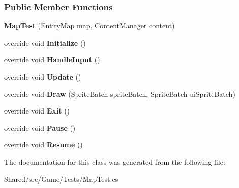 \subsubsection*{Public Member Functions}
\begin{DoxyCompactItemize}
\item 
\hypertarget{class_midnight_blue_1_1_testing_1_1_map_test_a7fb98572efcce64a85eaec1363fdddd4}{}\label{class_midnight_blue_1_1_testing_1_1_map_test_a7fb98572efcce64a85eaec1363fdddd4} 
{\bfseries Map\+Test} (Entity\+Map map, Content\+Manager content)
\item 
\hypertarget{class_midnight_blue_1_1_testing_1_1_map_test_adcaa2f37efbf5764b48d297cabf17784}{}\label{class_midnight_blue_1_1_testing_1_1_map_test_adcaa2f37efbf5764b48d297cabf17784} 
override void {\bfseries Initialize} ()
\item 
\hypertarget{class_midnight_blue_1_1_testing_1_1_map_test_ad7e54e4aec415ccf6e89ce8a8876d259}{}\label{class_midnight_blue_1_1_testing_1_1_map_test_ad7e54e4aec415ccf6e89ce8a8876d259} 
override void {\bfseries Handle\+Input} ()
\item 
\hypertarget{class_midnight_blue_1_1_testing_1_1_map_test_ae4bb817dd9c5b55bd1d818de9f527c7c}{}\label{class_midnight_blue_1_1_testing_1_1_map_test_ae4bb817dd9c5b55bd1d818de9f527c7c} 
override void {\bfseries Update} ()
\item 
\hypertarget{class_midnight_blue_1_1_testing_1_1_map_test_a03d0a9349662afafaa301a8581fbf01f}{}\label{class_midnight_blue_1_1_testing_1_1_map_test_a03d0a9349662afafaa301a8581fbf01f} 
override void {\bfseries Draw} (Sprite\+Batch sprite\+Batch, Sprite\+Batch ui\+Sprite\+Batch)
\item 
\hypertarget{class_midnight_blue_1_1_testing_1_1_map_test_a7dfcf609b9fd898f377297a0075d2159}{}\label{class_midnight_blue_1_1_testing_1_1_map_test_a7dfcf609b9fd898f377297a0075d2159} 
override void {\bfseries Exit} ()
\item 
\hypertarget{class_midnight_blue_1_1_testing_1_1_map_test_a7dba960137d634b15e4f4b7b3a86489f}{}\label{class_midnight_blue_1_1_testing_1_1_map_test_a7dba960137d634b15e4f4b7b3a86489f} 
override void {\bfseries Pause} ()
\item 
\hypertarget{class_midnight_blue_1_1_testing_1_1_map_test_aa595402e6d3702119877721f7cb3ab9f}{}\label{class_midnight_blue_1_1_testing_1_1_map_test_aa595402e6d3702119877721f7cb3ab9f} 
override void {\bfseries Resume} ()
\end{DoxyCompactItemize}


The documentation for this class was generated from the following file\+:\begin{DoxyCompactItemize}
\item 
Shared/src/\+Game/\+Tests/Map\+Test.\+cs\end{DoxyCompactItemize}
